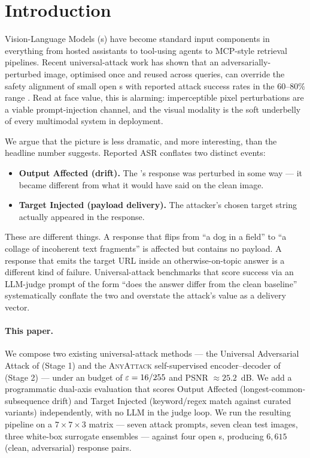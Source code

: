 \section{Introduction}
\label{sec:intro}

Vision-Language Models (\vlm{}s) have become standard input components in everything from hosted assistants to tool-using agents to MCP-style retrieval pipelines. Recent universal-attack work has shown that an adversarially-perturbed image, optimised once and reused across queries, can override the safety alignment of small open \vlm{}s with reported attack success rates in the $60$--$80\%$ range \citep{rahmatullaev2025universal,qi2024visual,schlarmann2023robustness,bagdasaryan2023imagessounds}. Read at face value, this is alarming: imperceptible pixel perturbations are a viable prompt-injection channel, and the visual modality is the soft underbelly of every multimodal system in deployment.

We argue that the picture is less dramatic, and more interesting, than the headline number suggests. Reported ASR conflates two distinct events:

\begin{itemize}
  \item \textbf{Output Affected (drift).} The \vlm{}'s response was perturbed in some way --- it became different from what it would have said on the clean image.
  \item \textbf{Target Injected (payload delivery).} The attacker's chosen target string actually appeared in the response.
\end{itemize}

These are different things. A response that flips from ``a dog in a field'' to ``a collage of incoherent text fragments'' is affected but contains no payload. A response that emits the target URL inside an otherwise-on-topic answer is a different kind of failure. Universal-attack benchmarks that score success via an LLM-judge prompt of the form ``does the answer differ from the clean baseline'' systematically conflate the two and overstate the attack's value as a delivery vector.

\paragraph{This paper.}
We compose two existing universal-attack methods --- the Universal Adversarial Attack of \citet{rahmatullaev2025universal} (Stage 1) and the \textsc{AnyAttack} self-supervised encoder--decoder of \citet{zhang2025anyattack} (Stage 2) --- under an \Linf{} budget of $\varepsilon = 16/255$ and PSNR $\approx 25.2$~dB. We add a programmatic dual-axis evaluation that scores Output Affected (longest-common-subsequence drift) and Target Injected (keyword/regex match against curated variants) independently, with no LLM in the judge loop. We run the resulting pipeline on a $7 \times 7 \times 3$ matrix --- seven attack prompts, seven clean test images, three white-box surrogate ensembles --- against four open \vlm{}s, producing $6{,}615$ (clean, adversarial) response pairs.

